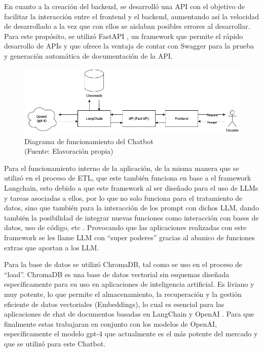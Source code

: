 En cuanto a la creación del backend, se desarrolló una API con el objetivo de facilitar la interacción entre el frontend y el backend, aumentando así la velocidad
de desarrollado a la vez que con ellos se aislaban posibles errores al desarrollar. Para este 
propósito, se utilizó FastAPI \cite{tiangoloFastAPI}, un framework que permite el rápido desarrollo de APIs y que ofrece la ventaja de contar con Swagger \cite{swaggerAPIDocumentation}
para la prueba y generación automática de documentación de la API.

\begin{figure}[ht!]
    \centering
    \includegraphics[width=.8\textwidth]{figures/finalhuemul.png}
    \caption[Diagrama de funcionamiento del Chatbot]{Diagrama de funcionamiento del Chatbot\\
    {\scriptsize (Fuente: Elavoración propia)}}
    \label{fig:chatbot1}
\end{figure}

Para el funcionamiento interno de la aplicación, de la misma manera que se utilizó en el proceso de ETL, 
que este también funciona en base a el framework Langchain, esto debido a que este framework al ser diseñado para el 
uso de LLMs y tareas asociadas a ellos, por lo que no solo funciona para el tratamiento de datos, sino que también para la interacción 
de los prompt con dichos LLM, dando también la posibilidad de integrar nuevas funciones como interacción con 
bases de datos, uso de código, etc \cite{langchain1}. Provocando que las aplicaciones realizadas con este framework se les 
llame LLM con ``super poderes'' gracias al abanico de funciones extras que aportan a los LLM.

Para la base de datos se utilizó ChromaDB, tal como se uso en el proceso de ``load''. ChromaDB es una base de datos vectorial sin esquemas diseñada específicamente para 
su uso en aplicaciones de inteligencia artificial. Es liviano y muy potente, lo que permite el almacenamiento, la recuperación 
y la gestión eficiente de datos vectoriales (Embeddings), lo cual es esencial para las aplicaciones de chat de documentos 
basadas en LangChain y OpenAI \cite{langchain1}. Para que finalmente estas trabajaran en conjunto con los modelos de OpenAI, 
específicamente el modelo gpt-4 que actualmente es el más potente del mercado y que se utilizó para este Chatbot.

